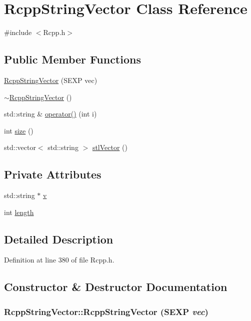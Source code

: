\hypertarget{classRcppStringVector}{
\section{RcppStringVector Class Reference}
\label{classRcppStringVector}
}


{\ttfamily \#include $<$Rcpp.h$>$}\subsection*{Public Member Functions}
\begin{DoxyCompactItemize}
\item 
\hyperlink{classRcppStringVector_af0216e26ab72efb7a6b07182224f84c5}{RcppStringVector} (SEXP vec)
\item 
\hyperlink{classRcppStringVector_a1b0550e206ac6945b00ee02c3c4bf373}{$\sim$RcppStringVector} ()
\item 
std::string \& \hyperlink{classRcppStringVector_aea5aa96f98f1c5b21e3c56ff60c7c413}{operator()} (int i)
\item 
int \hyperlink{classRcppStringVector_ac52a8eb61411546a62a70636709b1172}{size} ()
\item 
std::vector$<$ std::string $>$ \hyperlink{classRcppStringVector_a2bd817c9332e1446ddf034938b256cc3}{stlVector} ()
\end{DoxyCompactItemize}
\subsection*{Private Attributes}
\begin{DoxyCompactItemize}
\item 
std::string $\ast$ \hyperlink{classRcppStringVector_a94d14fa5093cc8219cbcb91aadfed09e}{v}
\item 
int \hyperlink{classRcppStringVector_aaa2e2e4335d14e46fc96b07836e99573}{length}
\end{DoxyCompactItemize}


\subsection{Detailed Description}


Definition at line 380 of file Rcpp.h.

\subsection{Constructor \& Destructor Documentation}
\hypertarget{classRcppStringVector_af0216e26ab72efb7a6b07182224f84c5}{
\subsubsection[{RcppStringVector}]{\setlength{\rightskip}{0pt plus 5cm}RcppStringVector::RcppStringVector (SEXP {\em vec})}}
\label{classRcppStringVector_af0216e26ab72efb7a6b07182224f84c5}


